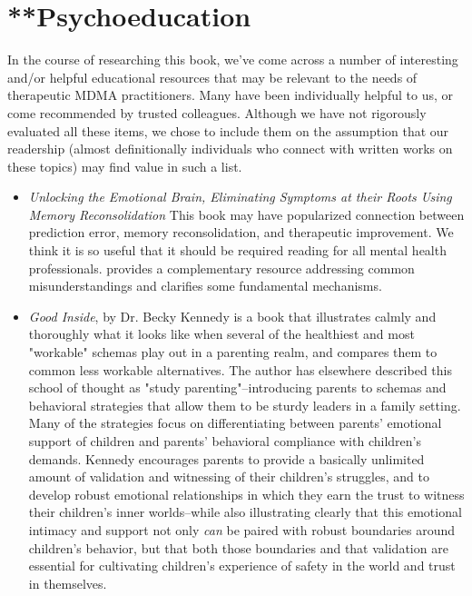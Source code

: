 \documentclass[12pt,letterpaper]{book}
\begin{document}
\chapter{**Psychoeducation}
\label{sec:psychoeducation}
In the course of researching this book, we've come across a number of interesting and/or helpful educational resources that may be relevant to the needs of therapeutic MDMA practitioners. Many have been individually helpful to us, or come recommended by trusted colleagues. Although we have not rigorously evaluated all these items, we chose to include them on the assumption that our readership (almost definitionally individuals who connect with written works on these topics) may find value in such a list.
\label{resources}
\begin{itemize}
    \item \textit{Unlocking the Emotional Brain, Eliminating Symptoms at their Roots Using Memory Reconsolidation} This book may have popularized connection between prediction error, memory reconsolidation, and therapeutic improvement. We think it is so useful that it should be required reading for all mental health professionals. \textcite{ecker2015misunderstood} provides a complementary resource addressing common misunderstandings and clarifies some fundamental mechanisms.
    \item \textit{Good Inside}, by Dr. Becky Kennedy \cite{kennedy2022good} is a book that illustrates calmly and thoroughly what it looks like when several of the healthiest and most "workable" schemas play out in a parenting realm, and compares them to common less workable alternatives. The author has elsewhere described this school of thought as "study parenting"–introducing parents to schemas and behavioral strategies that allow them to be sturdy leaders in a family setting. Many of the strategies focus on differentiating between parents' emotional support of children and parents' behavioral compliance with children's demands. Kennedy encourages parents to provide a basically unlimited amount of validation and witnessing of their children's struggles, and to develop robust emotional relationships in which they earn the trust to witness their children's inner worlds–while also illustrating clearly that this emotional intimacy and support not only \textit{can} be paired with robust boundaries around children's behavior, but that both those boundaries and that validation are essential for cultivating children's experience of safety in the world and trust in themselves. 


\end{itemize}
\end{document}
